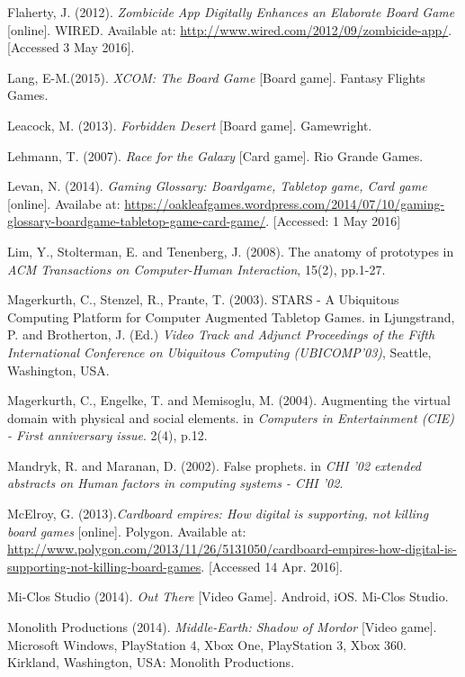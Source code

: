 \documentclass[a4paper,11pt]{report}
\begin{document}
\begin{thebibliography}{1}
Flaherty, J. (2012). \textit{Zombicide App Digitally Enhances an Elaborate Board Game} [online]. WIRED. Available at: \url{http://www.wired.com/2012/09/zombicide-app/}. [Accessed 3 May 2016].

Lang, E-M.(2015). \textit{XCOM: The Board Game} [Board game]. Fantasy Flights Games.

Leacock, M. (2013). \textit{Forbidden Desert} [Board game].  Gamewright.

Lehmann, T. (2007). \textit{Race for the Galaxy} [Card game]. Rio Grande Games.

Levan, N. (2014). \textit{Gaming Glossary: Boardgame, Tabletop game, Card game} [online]. Availabe at: \url{https://oakleafgames.wordpress.com/2014/07/10/gaming-glossary-boardgame-tabletop-game-card-game/}. [Accessed: 1 May 2016]

Lim, Y., Stolterman, E. and Tenenberg, J. (2008). The anatomy of prototypes in \textit{ACM Transactions on Computer-Human Interaction}, 15(2), pp.1-27.

Magerkurth, C., Stenzel, R., Prante, T. (2003). STARS - A Ubiquitous Computing Platform for Computer Augmented Tabletop Games. in Ljungstrand, P. and Brotherton, J. (Ed.) \textit{Video Track and Adjunct Proceedings of the Fifth
International Conference on Ubiquitous Computing (UBICOMP’03)}, Seattle, Washington, USA.

Magerkurth, C., Engelke, T. and Memisoglu, M. (2004). Augmenting the virtual domain with physical and social elements. in \textit{Computers in Entertainment (CIE) - First anniversary issue}. 2(4), p.12. 

Mandryk, R. and Maranan, D. (2002). False prophets. in \textit{CHI '02 extended abstracts on Human factors in computing systems - CHI '02}.

McElroy, G. (2013).\textit{Cardboard empires: How digital is supporting, not killing board games} [online]. Polygon. Available at: \url{http://www.polygon.com/2013/11/26/5131050/cardboard-empires-how-digital-is-supporting-not-killing-board-games}. [Accessed 14 Apr. 2016].

Mi-Clos Studio (2014). \textit{Out There} [Video Game]. Android, iOS. Mi-Clos Studio.

Monolith Productions (2014). \textit{Middle-Earth: Shadow of Mordor} [Video game]. Microsoft Windows, PlayStation 4, Xbox One, PlayStation 3, Xbox 360. Kirkland, Washington, USA: Monolith Productions.


\end{thebibliography}
\end{document}
